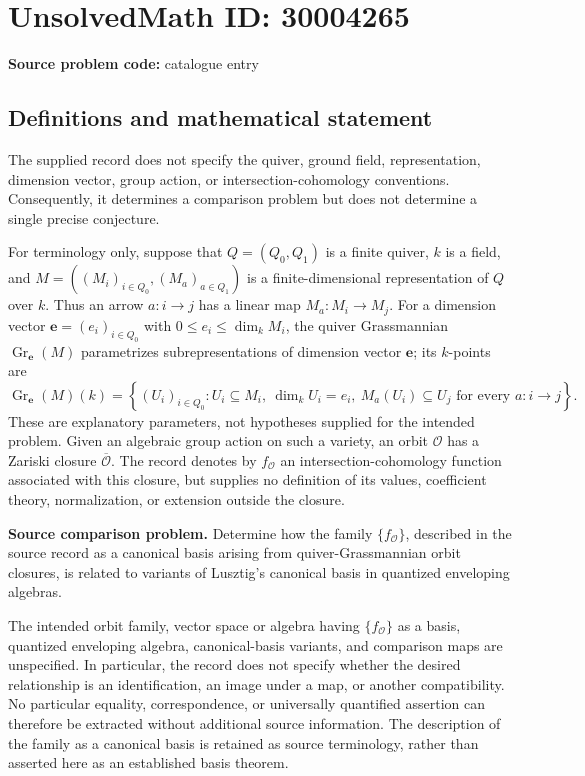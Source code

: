 \documentclass[11pt]{article}
\begin{document}
\section*{UnsolvedMath ID: 30004265}
\textbf{Source problem code:} catalogue entry
\subsection{Definitions and mathematical statement}
The supplied record does not specify the quiver, ground field, representation, dimension vector, group action, or intersection-cohomology conventions. Consequently, it determines a comparison problem but does not determine a single precise conjecture.

For terminology only, suppose that \(Q=(Q_0,Q_1)\) is a finite quiver, \(k\) is a field, and \(M=((M_i)_{i\in Q_0},(M_a)_{a\in Q_1})\) is a finite-dimensional representation of \(Q\) over \(k\). Thus an arrow \(a:i\to j\) has a linear map \(M_a:M_i\to M_j\). For a dimension vector \(\mathbf e=(e_i)_{i\in Q_0}\) with \(0\leq e_i\leq\dim_k M_i\), the quiver Grassmannian \(\operatorname{Gr}_{\mathbf e}(M)\) parametrizes subrepresentations of dimension vector \(\mathbf e\); its \(k\)-points are
\[
\operatorname{Gr}_{\mathbf e}(M)(k)=\left\{(U_i)_{i\in Q_0}: U_i\subseteq M_i,\ \dim_k U_i=e_i,\ M_a(U_i)\subseteq U_j\text{ for every }a:i\to j\right\}.
\]
These are explanatory parameters, not hypotheses supplied for the intended problem. Given an algebraic group action on such a variety, an orbit \(\mathcal O\) has a Zariski closure \(\overline{\mathcal O}\). The record denotes by \(f_{\mathcal O}\) an intersection-cohomology function associated with this closure, but supplies no definition of its values, coefficient theory, normalization, or extension outside the closure.

\textbf{Source comparison problem.} Determine how the family \(\{f_{\mathcal O}\}\), described in the source record as a canonical basis arising from quiver-Grassmannian orbit closures, is related to variants of Lusztig's canonical basis in quantized enveloping algebras.

The intended orbit family, vector space or algebra having \(\{f_{\mathcal O}\}\) as a basis, quantized enveloping algebra, canonical-basis variants, and comparison maps are unspecified. In particular, the record does not specify whether the desired relationship is an identification, an image under a map, or another compatibility. No particular equality, correspondence, or universally quantified assertion can therefore be extracted without additional source information. The description of the family as a canonical basis is retained as source terminology, rather than asserted here as an established basis theorem.
\end{document}
